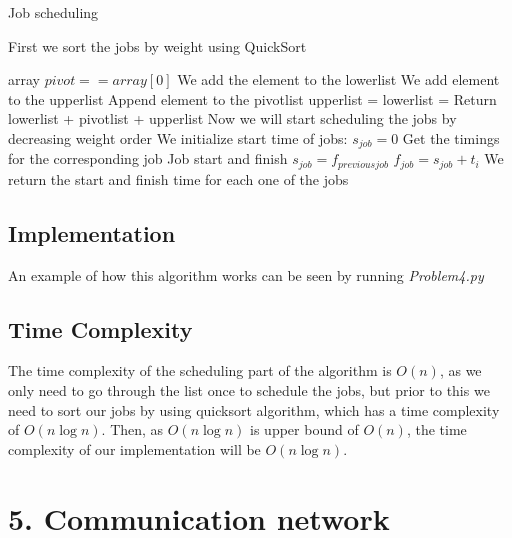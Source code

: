 \documentclass{article}
\begin{document}
\begin{algorithm}[H]
\caption{Job scheduling}
\begin{algorithmic}[1]
\State First we sort the jobs by weight using QuickSort

  \Return array
 \EndIf
  \State $pivot == array[0]$
    \State We add the element to the lowerlist
   \EndIf
    \State We add element to the upperlist
   \EndIf
    \State Append element to the pivotlist
   \EndIf
  \EndFor
  \State upperlist = 
  \State lowerlist = 
 \EndIf
 \State Return lowerlist + pivotlist + upperlist
\EndFunction
\State
\State Now we will start scheduling the jobs by decreasing weight order
\State We initialize start time of jobs: $s_{job} = 0$
 \State Get the timings for the corresponding job
 \State
 \State Job start and finish
 \State $s_{job} = f_{previous job}$
 \State $f_{job} = s_{job} + t_{i}$
 \State
 \State We return the start and finish time for each one of the jobs

\EndWhile
\end{algorithmic}
\end{algorithm}

\subsection*{Implementation}

An example of how this algorithm works can be seen by running \textit{Problem4.py}

\subsection*{Time Complexity}

The time complexity of the scheduling part of the algorithm is $O(n)$, as we only need to go through the list once to schedule the jobs, but prior to this we need to sort our jobs by using quicksort algorithm, which has a time complexity of $O(n\log n)$. Then, as $O(n\log n)$ is upper bound of $O(n)$, the time complexity of our implementation will be $O(n\log n)$.

\section*{5. Communication network}
\end{document}
